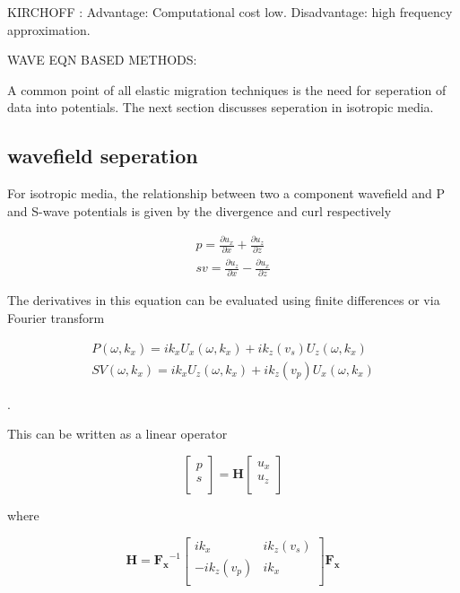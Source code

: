 KIRCHOFF \cite{doi:10.1190/1.1444783}: Advantage: Computational cost low. Disadvantage: high frequency approximation.

WAVE EQN BASED METHODS: 





A common point of all elastic migration techniques is the need for seperation of data into potentials. The next section discusses seperation in isotropic media.

\subsection{wavefield seperation}

For isotropic media, the relationship between two a component wavefield and P and S-wave potentials is given by the divergence and curl respectively

\begin{align}
p = \frac{\partial u_x}{\partial x} + \frac{\partial u_z}{\partial z}\\
sv = \frac{\partial u_z}{\partial x} - \frac{\partial u_x}{\partial z} 
\end{align}

The derivatives in this equation can be evaluated using finite differences or via Fourier transform 

\begin{align}
P(\omega,k_x) = i k_x U_x(\omega,k_x) + i k_z(v_s) U_z(\omega,k_x)\\
SV(\omega,k_x) = i k_x U_z(\omega,k_x) + i k_z(v_p) U_x(\omega,k_x)
\end{align}

\citep{etgen1988}.

This can be written as a linear operator

\begin{equation}
\begin{bmatrix}
	p\\
	s\\
\end{bmatrix}
=\mathbf{H}
\begin{bmatrix}
	u_x\\
	u_z\\
\end{bmatrix}
\end{equation}

where

\begin{equation}
\mathbf{H} = \mathbf{F_x}^{-1}
\begin{bmatrix}
	ik_x & ik_z(v_s)\\
 -ik_z(v_p) & ik_x\\
\end{bmatrix}\mathbf{F_x}
\end{equation}

